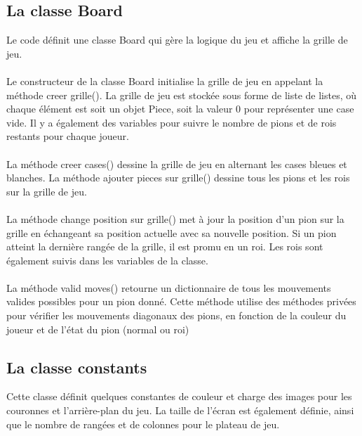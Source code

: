 \documentclass[12pt]{article}
\begin{document}
	\subsection{La classe Board}
	 Le code définit une classe Board qui gère la logique du jeu et affiche la grille de jeu.\\
	 \\
	 Le constructeur de la classe Board initialise la grille de jeu en appelant la méthode creer grille(). La grille de jeu est stockée sous forme de liste de listes, où chaque élément est soit un objet Piece, soit la valeur 0 pour représenter une case vide. Il y a également des variables pour suivre le nombre de pions et de rois restants pour chaque joueur. \\
	 \\
	 La méthode creer cases() dessine la grille de jeu en alternant les cases bleues et blanches. La méthode ajouter pieces sur grille() dessine tous les pions et les rois sur la grille de jeu.\\
	 \\
	 La méthode change position sur grille() met à jour la position d'un pion sur la grille en échangeant sa position actuelle avec sa nouvelle position. Si un pion atteint la dernière rangée de la grille, il est promu en un roi. Les rois sont également suivis dans les variables de la classe.\\
	 \\
	 La méthode valid moves() retourne un dictionnaire de tous les mouvements valides possibles pour un pion donné. Cette méthode utilise des méthodes privées pour vérifier les mouvements diagonaux des pions, en fonction de la couleur du joueur et de l'état du pion (normal ou roi)
	 \subsection{La classe constants}
	 Cette classe définit quelques constantes de couleur et charge des images pour les couronnes et l'arrière-plan du jeu. La taille de l'écran est également définie, ainsi que le nombre de rangées et de colonnes pour le plateau de jeu.
\end{document}
